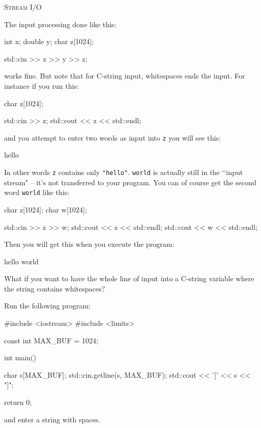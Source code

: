 \textsc{Stream I/O}

The input processing done like this:
\begin{console}[fontsize=\small]
int x;
double y;
char z[1024];

std::cin >> x >> y >> z;
\end{console}
works fine.
But note that for C-string input, whitespaces ends the input.
For instance if you run this:
\begin{console}[fontsize=\small]
char z[1024];

std::cin >> z;
std::cout << z << std::endl;
\end{console}
and you attempt to enter two words as input into \verb!z! you will see this:
\begin{console}[fontsize=\small,commandchars=\\\{\}]
hello
\end{console}
In other words \verb!z! contains only \verb!"hello"!.
\verb!world! is actually still in the \lq\lq input stream" -- it's not
transferred to your program.
You can of course get the second word \verb!world! like this:
\begin{console}[fontsize=\small]
char z[1024];
char w[1024];

std::cin >> z >> w;
std::cout << z << std::endl;
std::cout << w << std::endl;
\end{console}
Then you will get this when you execute the program:
\begin{console}[fontsize=\small, commandchars=\\\{\}]
hello
world
\end{console}

What if you want to have the whole line of input into a C-string
variable where the string contains whitespaces?

Run the following program:
\begin{console}[fontsize=\small]
#include <iostream> 
#include <limits> 

const int MAX_BUF = 1024; 

int main() 
{ 
    char s[MAX_BUF]; 
    std::cin.getline(s, MAX_BUF); 
    std::cout << '[' << s << "]\n"; 

    return 0;
} 
\end{console}
and enter a string with spaces.

